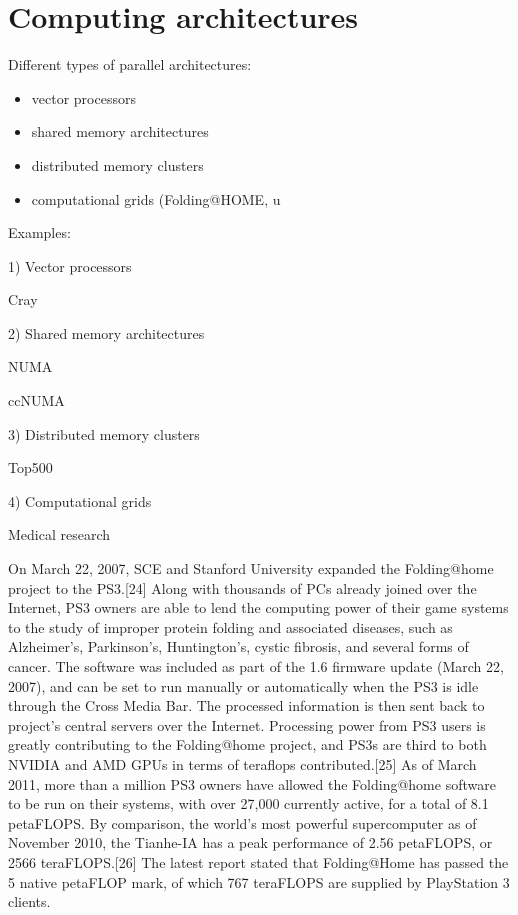\section{Computing architectures}

Different types of parallel architectures:
\begin{itemize}
\item vector processors
\item shared memory architectures
\item distributed memory clusters
\item computational grids (Folding@HOME, u
\end{itemize}

Examples:

1) Vector processors

Cray

2) Shared memory architectures

NUMA

ccNUMA

3) Distributed memory clusters

Top500

4) Computational grids

Medical research

On March 22, 2007, SCE and Stanford University expanded the Folding@home project to the PS3.[24] Along with thousands of PCs already joined over the Internet, PS3 owners are able to lend the computing power of their game systems to the study of improper protein folding and associated diseases, such as Alzheimer's, Parkinson's, Huntington's, cystic fibrosis, and several forms of cancer. The software was included as part of the 1.6 firmware update (March 22, 2007), and can be set to run manually or automatically when the PS3 is idle through the Cross Media Bar. The processed information is then sent back to project's central servers over the Internet. Processing power from PS3 users is greatly contributing to the Folding@home project, and PS3s are third to both NVIDIA and AMD GPUs in terms of teraflops contributed.[25] As of March 2011, more than a million PS3 owners have allowed the Folding@home software to be run on their systems, with over 27,000 currently active, for a total of 8.1 petaFLOPS. By comparison, the world's most powerful supercomputer as of November 2010, the Tianhe-IA has a peak performance of 2.56 petaFLOPS, or 2566 teraFLOPS.[26] The latest report stated that Folding@Home has passed the 5 native petaFLOP mark, of which 767 teraFLOPS are supplied by PlayStation 3 clients.
